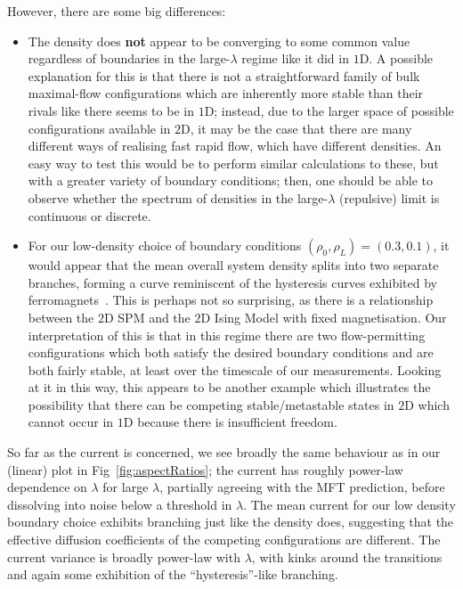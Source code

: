 However, there are some big differences:
\begin{itemize}
 \item The density does \textbf{not} appear to be converging to some common value regardless of
 boundaries in the large-$\lambda$ regime like it did in $1$D. A possible explanation for this
 is that there is not a straightforward family of bulk maximal-flow configurations which are
 inherently more stable than their rivals like there seems to be in $1$D; instead, due to the
 larger space of possible configurations available in $2$D, it may be the case that there are many
 different ways of realising fast rapid flow, which have different densities. An easy way to test
 this would be to perform similar calculations to these, but with a greater variety of boundary
 conditions; then, one should be able to observe whether the spectrum of densities in
 the large-$\lambda$ (repulsive) limit is continuous or discrete.
 \item For our low-density choice of boundary conditions $(\rho_0, \rho_L) = (0.3, 0.1)$,
 it would appear that the mean overall system density splits into two separate branches,
 forming a curve reminiscent of the hysteresis curves exhibited by
 ferromagnets~\cite{chikazumi1997}. This
 is perhaps not so surprising, as there is a relationship between the $2$D SPM and the $2$D Ising
 Model with fixed magnetisation. Our interpretation of this is that in this regime there are
 two flow-permitting configurations which both satisfy the desired boundary conditions
 and are both fairly stable, at least over the timescale of our measurements. Looking at it in 
 this way, this appears to be another example which illustrates the possibility that there can
 be competing stable/metastable states in $2$D which cannot occur in $1$D because there is
 insufficient freedom.
\end{itemize}
So far as the current is concerned, we see broadly the same behaviour as in our (linear) plot
in Fig~\ref{fig:aspectRatios}; the current has roughly power-law dependence on $\lambda$ for
large $\lambda$, partially agreeing with the MFT prediction, before dissolving into noise
below a threshold in $\lambda$. The mean current for our low density boundary choice exhibits branching just
like
the density does, suggesting that the effective diffusion coefficients of the competing 
configurations are different. The current variance is broadly power-law with $\lambda$,
with kinks around the transitions and again some exhibition of the ``hysteresis''-like branching.


